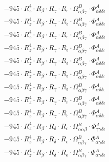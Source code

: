 \documentclass{article}
\begin{document}
\begin{subequations}
\begin{gather}
\begin{array}{c}
 \\[0.2em] 		 - 945 \cdot R_{z}^{4} \cdot R_{\beta{}} \cdot R_{\gamma{}} \cdot R_{\epsilon{}} \cdot \Omega{}^{B}_{\alpha{}\beta{}\gamma{}} \cdot \Phi{}^{A}_{\alpha{}\delta{}\delta{}\epsilon{}} 
 \\[0.2em] 		 - 945 \cdot R_{z}^{4} \cdot R_{\beta{}} \cdot R_{\gamma{}} \cdot R_{\epsilon{}} \cdot \Omega{}^{B}_{\alpha{}\beta{}\gamma{}} \cdot \Phi{}^{A}_{\alpha{}\delta{}\delta{}\epsilon{}} 
 \\[0.2em] 		 - 945 \cdot R_{z}^{4} \cdot R_{\beta{}} \cdot R_{\gamma{}} \cdot R_{\epsilon{}} \cdot \Omega{}^{B}_{\alpha{}\beta{}\gamma{}} \cdot \Phi{}^{A}_{\alpha{}\delta{}\delta{}\epsilon{}} 
 \\[0.2em] 		 - 945 \cdot R_{z}^{4} \cdot R_{\beta{}} \cdot R_{\gamma{}} \cdot R_{\epsilon{}} \cdot \Omega{}^{B}_{\alpha{}\beta{}\gamma{}} \cdot \Phi{}^{A}_{\alpha{}\delta{}\delta{}\epsilon{}} 
 \\[0.2em] 		 - 945 \cdot R_{z}^{4} \cdot R_{\beta{}} \cdot R_{\gamma{}} \cdot R_{\epsilon{}} \cdot \Omega{}^{B}_{\alpha{}\beta{}\gamma{}} \cdot \Phi{}^{A}_{\alpha{}\delta{}\delta{}\epsilon{}} 
 \\[0.2em] 		 - 945 \cdot R_{z}^{4} \cdot R_{\beta{}} \cdot R_{\gamma{}} \cdot R_{\epsilon{}} \cdot \Omega{}^{B}_{\alpha{}\beta{}\gamma{}} \cdot \Phi{}^{A}_{\alpha{}\delta{}\delta{}\epsilon{}} 
 \\[0.2em] 		 - 945 \cdot R_{z}^{4} \cdot R_{\beta{}} \cdot R_{\gamma{}} \cdot R_{\epsilon{}} \cdot \Omega{}^{B}_{\alpha{}\beta{}\gamma{}} \cdot \Phi{}^{A}_{\alpha{}\delta{}\delta{}\epsilon{}} 
 \\[0.2em] 		 - 945 \cdot R_{z}^{4} \cdot R_{\beta{}} \cdot R_{\gamma{}} \cdot R_{\epsilon{}} \cdot \Omega{}^{B}_{\alpha{}\beta{}\gamma{}} \cdot \Phi{}^{A}_{\alpha{}\delta{}\delta{}\epsilon{}} 
 \\[0.2em] 		 - 945 \cdot R_{z}^{4} \cdot R_{\beta{}} \cdot R_{\gamma{}} \cdot R_{\epsilon{}} \cdot \Omega{}^{B}_{\alpha{}\beta{}\gamma{}} \cdot \Phi{}^{A}_{\alpha{}\delta{}\delta{}\epsilon{}} 
 \\[0.2em] 		 - 945 \cdot R_{z}^{4} \cdot R_{\beta{}} \cdot R_{\delta{}} \cdot R_{\epsilon{}} \cdot \Omega{}^{B}_{\alpha{}\alpha{}\beta{}} \cdot \Phi{}^{A}_{\gamma{}\gamma{}\delta{}\epsilon{}} 
 \\[0.2em] 		 - 945 \cdot R_{z}^{4} \cdot R_{\beta{}} \cdot R_{\delta{}} \cdot R_{\epsilon{}} \cdot \Omega{}^{B}_{\alpha{}\beta{}\gamma{}} \cdot \Phi{}^{A}_{\alpha{}\gamma{}\delta{}\epsilon{}} 
 \\[0.2em] 		 - 945 \cdot R_{z}^{4} \cdot R_{\beta{}} \cdot R_{\delta{}} \cdot R_{\epsilon{}} \cdot \Omega{}^{B}_{\alpha{}\beta{}\gamma{}} \cdot \Phi{}^{A}_{\alpha{}\gamma{}\delta{}\epsilon{}} 

\end{array}
\end{gather}
\end{subequations}
\end{document}
